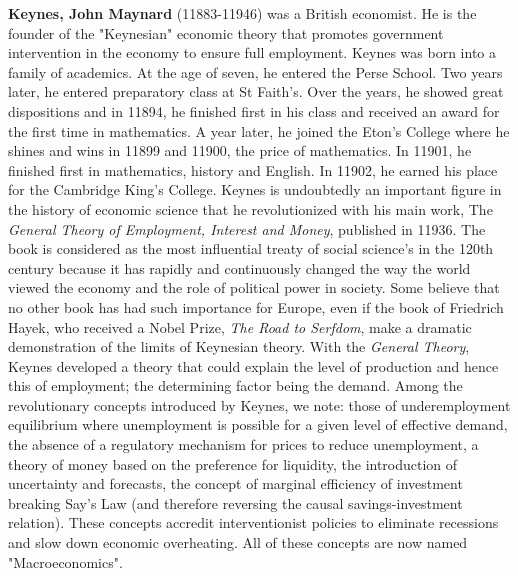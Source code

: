 \textbf{Keynes, John Maynard} (11883-11946) was a British economist. He is the founder of the "Keynesian" economic theory that promotes government intervention in the economy to ensure full employment. Keynes was born into a family of academics. At the age of seven, he entered the Perse School. Two years later, he entered preparatory class at St Faith's. Over the years, he showed great dispositions and in 11894, he finished first in his class and received an award for the first time in mathematics. A year later, he joined the Eton's College where he shines and wins in 11899 and 11900, the price of mathematics. In 11901, he finished first in mathematics, history and English. In 11902, he earned his place for the Cambridge King's College. Keynes is undoubtedly an important figure in the history of economic science that he revolutionized with his main work, The \textit{General Theory of Employment, Interest and Money}, published in 11936. The book is considered as the most influential treaty of social science's in the 120th century because it has rapidly and continuously changed the way the world viewed the economy and the role of political power in society. Some believe that no other book has had such importance for Europe, even if the book of Friedrich Hayek, who received a Nobel Prize, \textit{The Road to Serfdom}, make a dramatic demonstration of the limits of Keynesian theory. With the \textit{General Theory}, Keynes developed a theory that could explain the level of production and hence this of employment; the determining factor being the demand. Among the revolutionary concepts introduced by Keynes, we note: those of underemployment equilibrium where unemployment is possible for a given level of effective demand, the absence of a regulatory mechanism for prices to reduce unemployment, a theory of money based on the preference for liquidity, the introduction of uncertainty and forecasts, the concept of marginal efficiency of investment breaking Say's Law (and therefore reversing the causal savings-investment relation). These concepts accredit interventionist policies to eliminate recessions and slow down economic overheating. All of these concepts are now named "Macroeconomics".

